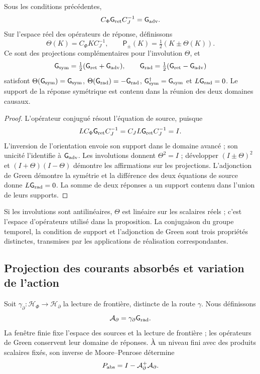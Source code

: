 \begin{proposition}
\label{vii:prop:green-paridades}
Sous les conditions précédentes,
\[
 C_\Phi \mathsf{G}_{\rm ret}C_J^{-1}=\mathsf{G}_{\rm adv}.
\]
Sur l'espace réel des opérateurs de réponse, définissons
\[
 \Theta(K)=C_\Phi K C_J^{-1},\qquad
 \mathsf P_\pm(K)=\tfrac12(K\pm\Theta(K)).
\]
Ce sont des projections complémentaires pour l'involution \(\Theta\), et
\begin{equation}
 \mathsf{G}_{\rm sym}=\tfrac12(\mathsf{G}_{\rm ret}+\mathsf{G}_{\rm adv}),\qquad
 \mathsf{G}_{\rm rad}=\tfrac12(\mathsf{G}_{\rm ret}-\mathsf{G}_{\rm adv})
 \label{vii:eq:descomposicion-green}
\end{equation}
satisfont \(\Theta(\mathsf{G}_{\rm sym})=\mathsf{G}_{\rm sym}\),
\(\Theta(\mathsf{G}_{\rm rad})=-\mathsf{G}_{\rm rad}\),
\(\mathsf{G}_{\rm sym}^{\dagger}=\mathsf{G}_{\rm sym}\) et
\(L\mathsf{G}_{\rm rad}=0\). Le support de la réponse symétrique est contenu
dans la réunion des deux domaines causaux.
\end{proposition}
\begin{proof}
L'opérateur conjugué résout l'équation de source, puisque
\[
 LC_\Phi \mathsf{G}_{\rm ret}C_J^{-1}=C_JL\mathsf{G}_{\rm ret}C_J^{-1}=I.
\]
L'inversion de l'orientation envoie son support dans le domaine avancé ;
son unicité l'identifie à \(\mathsf{G}_{\rm adv}\). Les involutions donnent
\(\Theta^2=I\) ; développer \((I\pm\Theta)^2\) et
\((I+\Theta)(I-\Theta)\) démontre les affirmations sur les projections.
L'adjonction de Green démontre la symétrie et la différence des deux
équations de source donne \(L\mathsf{G}_{\rm rad}=0\). La somme de deux réponses
a un support contenu dans l'union de leurs supports.
\end{proof}

Si les involutions sont antilinéaires, \(\Theta\) est linéaire sur les scalaires réels ; c'est l'espace d'opérateurs utilisé dans la proposition. La conjugaison du groupe temporel, la condition de support et l'adjonction de Green sont trois propriétés distinctes, transmises par les applications de réalisation correspondantes.

\subsection{Projection des courants absorbés et variation de l'action}
\label{vii:subsec:proyeccion-absorcion}

Soit \(\gamma_\partial:\mathcal H_\Phi\to\mathcal H_\partial\)
la lecture de frontière, distincte de la route \(\gamma\). Nous définissons
\[
 \mathcal A_\partial=\gamma_\partial \mathsf{G}_{\rm rad}.
\]
La fenêtre finie fixe l'espace des sources et la lecture de frontière ;
les opérateurs de Green conservent leur domaine de réponses. À un niveau fini avec
des produits scalaires fixés, son inverse de
Moore--Penrose détermine
\begin{equation}
 P_{\rm abs}=I-\mathcal A_\partial^+\mathcal A_\partial.
 \label{vii:eq:proyector-absorcion}
\end{equation}

